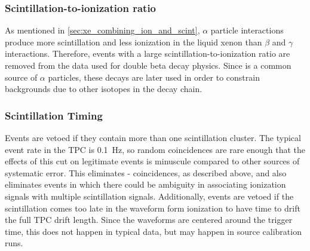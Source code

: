 \documentclass[herrin-thesis.tex]{subfiles}
\begin{document}
\subsubsection{Scintillation-to-ionization ratio}
As mentioned in \cref{sec:xe_combining_ion_and_scint}, \(\alpha\) particle interactions produce more scintillation and less ionization in the liquid xenon than \(\beta\) and \(\gamma\) interactions. Therefore, events with a large scintillation-to-ionization ratio are removed from the data used for double beta decay physics. Since  is a common source of \(\alpha\) particles, these decays are later used in order to constrain backgrounds due to other isotopes in the  decay chain.

\subsubsection{Scintillation Timing}
Events are vetoed if they contain more than one scintillation cluster. The typical event rate in the TPC is \about{}\SI{0.1}{\Hz}, so random coincidences are rare enough that the effects of this cut on legitimate events is minuscule compared to other sources of systematic error. This eliminates - coincidences, as described above, and also eliminates events in which there could be ambiguity in associating ionization signals with multiple scintillation signals. Additionally, events are vetoed if the scintillation comes too late in the waveform form ionization to have time to drift the full TPC drift length. Since the waveforms are centered around the trigger time, this does not happen in typical data, but may happen in source calibration runs.
\end{document}
